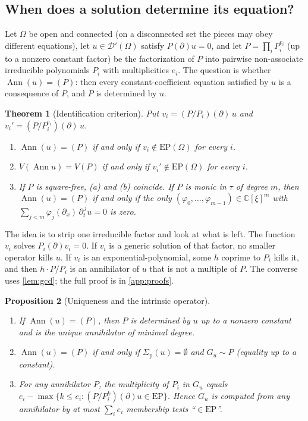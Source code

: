 \documentclass[11pt]{article}
\theoremstyle{plain}
\newtheorem{theorem}{Theorem}[section]
\newtheorem{proposition}[theorem]{Proposition}
\theoremstyle{definition}
\theoremstyle{remark}
\newcommand{\C}{\mathbb{C}}
\DeclareMathOperator{\Ann}{Ann}             %
\newcommand{\Var}{V}                        %
\newcommand{\EP}{\mathrm{EP}}               %
\newcommand{\Gu}{G_u}                       %
\newcommand{\sigp}{\Sigma_{\mathrm p}}      %
\begin{document}
\subsection{When does a solution determine its equation?}\label{sec:ident}
Let $\Omega$ be open and connected (on a disconnected set the pieces may obey different equations),
let $u\in\mathcal D'(\Omega)$ satisfy $P(\partial)u=0$, and let $P=\prod_iP_i^{e_i}$ (up to a nonzero constant factor) be the
factorization of $P$ into pairwise non-associate irreducible polynomials $P_i$ with multiplicities
$e_i$. The question is whether $\Ann(u)=(P)$: then every constant-coefficient equation satisfied by
$u$ is a consequence of $P$, and $P$ is determined by $u$.

\begin{theorem}[Identification criterion]\label{thm:ident}
Put $v_i=(P/P_i)(\partial)\,u$ and $v_i'=(P/P_i^{e_i})(\partial)\,u$.
\begin{enumerate}[label=(\alph*)]
  \item $\Ann(u)=(P)$ if and only if $v_i\notin\EP(\Omega)$ for every $i$.
  \item $\Var(\Ann u)=\Var(P)$ if and only if $v_i'\notin\EP(\Omega)$ for every $i$.
  \item If $P$ is square-free, (a) and (b) coincide. If $P$ is monic in $\tau$ of degree $m$, then
  $\Ann(u)=(P)$ if and only if the only $(\varphi_0,\dots,\varphi_{m-1})\in\C[\xi]^m$ with
  $\sum_{j<m}\varphi_j(\partial_x)\,\partial_t^{\,j}u=0$ is zero.
\end{enumerate}
\end{theorem}

The idea is to strip one irreducible factor and look at what is left. The function $v_i$ solves
$P_i(\partial)v_i=0$. If $v_i$ is a generic solution of that factor, no smaller operator kills $u$.
If $v_i$ is an exponential-polynomial, some $h$ coprime to $P_i$ kills it, and then
$h\cdot P/P_i$ is an annihilator of $u$ that is not a multiple of $P$. The converse uses
\cref{lem:gcd}; the full proof is in \cref{app:proofs}.

\begin{proposition}[Uniqueness and the intrinsic operator]\label{prop:unique}
\begin{enumerate}[label=(\alph*)]
  \item If $\Ann(u)=(P)$, then $P$ is determined by $u$ up to a nonzero constant and is the unique
  annihilator of minimal degree.
  \item $\Ann(u)=(P)$ if and only if $\sigp(u)=\emptyset$ and $\Gu\sim P$ (equality up to a constant).
  \item For any annihilator $P$, the multiplicity of $P_i$ in $\Gu$ equals $e_i-\max\{k\le e_i:
  (P/P_i^{k})(\partial)u\in\EP\}$. Hence $\Gu$ is computed from any annihilator by at most
  $\sum_ie_i$ membership tests ``$\in\EP$''.
\end{enumerate}
\end{proposition}
\end{document}
